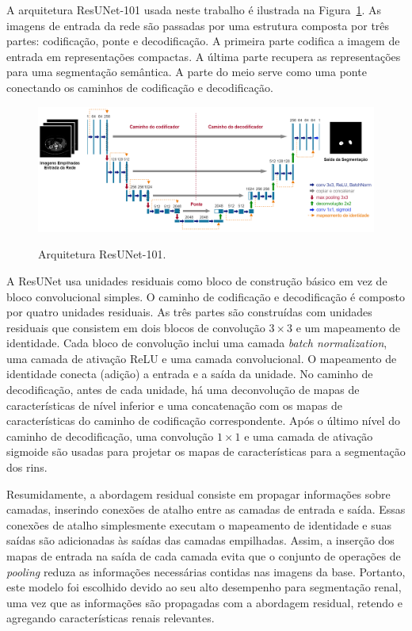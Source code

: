 A arquitetura ResUNet-101 usada neste trabalho é ilustrada na Figura~\ref{fig:arquitetura_ResUNet}. As imagens de entrada da rede são passadas por uma estrutura composta por três partes: codificação, ponte e decodificação. A primeira parte codifica a imagem de entrada em representações compactas. A última parte recupera as representações para uma segmentação semântica. A parte do meio serve como uma ponte conectando os caminhos de codificação e decodificação.

\begin{figure}[!ht]
    \centering
    \caption{Arquitetura ResUNet-101.}
    \includegraphics[width=1\textwidth]{figuras/arquitetura_ResUNet.png}
    \label{fig:arquitetura_ResUNet}
\end{figure}

A ResUNet usa unidades residuais como bloco de construção básico em vez de bloco convolucional simples. O caminho de codificação e decodificação é composto por quatro unidades residuais. As três partes são construídas com unidades residuais que consistem em dois blocos de convolução $3\times3$ e um mapeamento de identidade. Cada bloco de convolução inclui uma camada \textit{batch normalization}, uma camada de ativação ReLU e uma camada convolucional. O mapeamento de identidade conecta (adição) a entrada e a saída da unidade. No caminho de decodificação, antes de cada unidade, há uma deconvolução de mapas de características de nível inferior e uma concatenação com os mapas de características do caminho de codificação correspondente. Após o último nível do caminho de decodificação, uma convolução $1\times1$ e uma camada de ativação sigmoide são usadas para projetar os mapas de características para a segmentação dos rins.

Resumidamente, a abordagem residual consiste em propagar informações sobre camadas, inserindo conexões de atalho entre as camadas de entrada e saída. Essas conexões de atalho simplesmente executam o mapeamento de identidade e suas saídas são adicionadas às saídas das camadas empilhadas. Assim, a inserção dos mapas de entrada na saída de cada camada evita que o conjunto de operações de \textit{pooling} reduza as informações necessárias contidas nas imagens da base. Portanto, este modelo foi escolhido devido ao seu alto desempenho para segmentação renal, uma vez que as informações são propagadas com a abordagem residual, retendo e agregando características renais relevantes.

